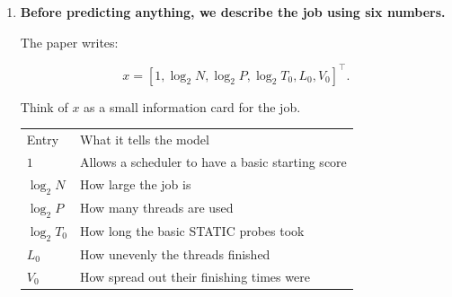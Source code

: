 \documentclass[11pt,a4paper]{article}
\providecommand{\tightlist}{\setlength{\itemsep}{0pt}\setlength{\parskip}{3pt}}
\newcommand{\toprule}{\hline\noalign{\vskip3pt}}
\newcommand{\midrule}{\noalign{\vskip2pt}\hline\noalign{\vskip3pt}}
\newcommand{\bottomrule}{\noalign{\vskip3pt}\hline}
\begin{document}
\begin{enumerate}
  \begin{itemize}
  \tightlist
  \item
    \(d(H)\) is the average saving per job with \(H\) useful executions, before charging training.
  \item
    The ceiling brackets \(\lceil\ \rceil\) mean \textbf{round up to a whole number}.
  \end{itemize}

  Example: if training costs 36 seconds and each job saves 0.075 seconds:

  \[
  R_{\min}
  =
  \left\lceil\frac{36}{0.075}\right\rceil
  =480.
  \]

  You need approximately 480 such jobs to recover the preparation expense.

  \textbf{Measured result:} model preparation cost \textbf{35.97 elapsed seconds and 83.89 CPU seconds}.

  For Guided 4 with 50 useful executions per job, the estimated repayment counts were:

  \begin{itemize}
  \tightlist
  \item
    \textbf{488 jobs for elapsed time.}
  \item
    \textbf{409 jobs for CPU time.}
  \end{itemize}

  Those are estimates for the workload mixture we tested.

  If each job saves nothing, or costs more, repeating it cannot repay training. That explains the condition \(d(H)>0\).
\item
  \textbf{Before predicting anything, we describe the job using six numbers.}

  The paper writes:

  \[
  x=
  [1,\log_2N,\log_2P,\log_2T_0,L_0,V_0]^\top.
  \]

  Think of \(x\) as a small information card for the job.

  {\def\LTcaptype{none} %
  \begin{longtable}[]{@{}
    >{\raggedright\arraybackslash}p{}
    >{\raggedright\arraybackslash}p{}@{}}
  \toprule\noalign{}
  Entry & What it tells the model \\
  \midrule\noalign{}
  \endhead
  \bottomrule\noalign{}
  \endlastfoot
  \(1\) & Allows a scheduler to have a basic starting score \\
  \(\log_2N\) & How large the job is \\
  \(\log_2P\) & How many threads are used \\
  \(\log_2T_0\) & How long the basic STATIC probes took \\
  \(L_0\) & How unevenly the threads finished \\
  \(V_0\) & How spread out their finishing times were \\
  \end{longtable}
  }


\end{enumerate}
\end{document}
